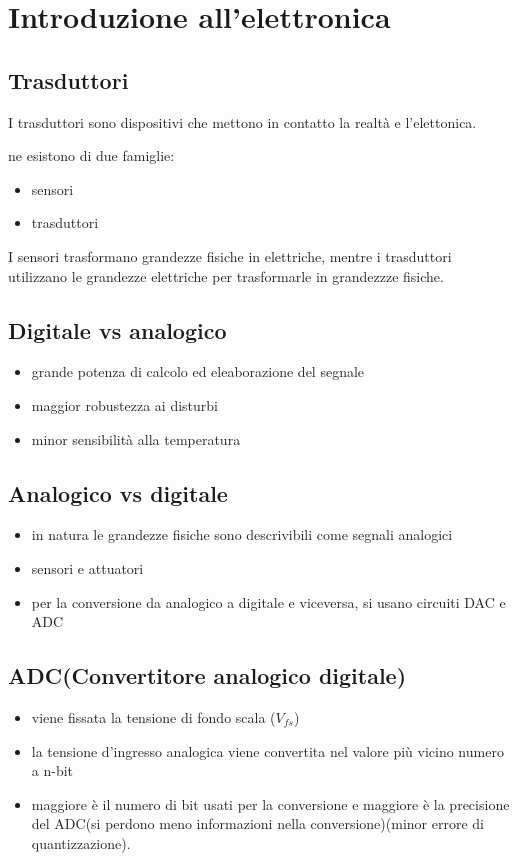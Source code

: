 \section{Introduzione all'elettronica}
\subsection{Trasduttori}
I trasduttori sono dispositivi che mettono in contatto la realtà e l'elettonica.

ne esistono di due famiglie:
\begin{itemize}
    \item sensori
    \item trasduttori
\end{itemize}

I sensori trasformano grandezze fisiche in elettriche, mentre i trasduttori utilizzano le grandezze elettriche per trasformarle in grandezzze fisiche.

\subsection{Digitale vs analogico}
\begin{itemize}
    \item grande potenza di calcolo ed eleaborazione del segnale
    \item maggior robustezza ai disturbi
    \item minor sensibilità alla temperatura
\end{itemize}

\subsection{Analogico vs digitale}
\begin{itemize}
    \item in natura le grandezze fisiche sono descrivibili come segnali analogici
    \item sensori e attuatori
    \item per la conversione da analogico a digitale e viceversa, si usano circuiti DAC e ADC
\end{itemize}

\subsection{ADC(Convertitore analogico digitale)}
\begin{itemize}
    \item viene fissata la tensione di fondo scala ($V_{fs}$)
    \item la tensione d'ingresso analogica viene convertita nel valore più vicino numero a n-bit
    \item maggiore è il numero di bit usati per la conversione e maggiore è la precisione del ADC(si perdono meno informazioni nella conversione)(minor errore di quantizzazione).
\end{itemize}


